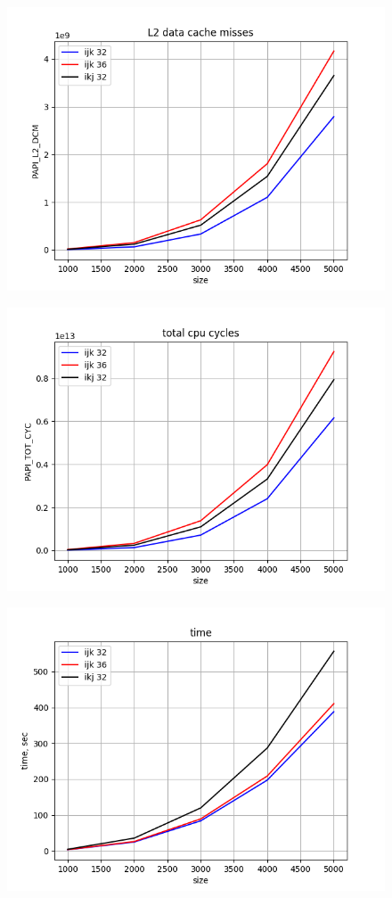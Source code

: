 \documentclass[14pt]{extarticle}
\begin{document}
\begin{figure}[H]
	\centering
	\includegraphics[scale=1]{Figure_2}
\end{figure}

\begin{figure}[H]
	\centering
	\includegraphics[scale=1]{Figure_3}
\end{figure}

\begin{figure}[H]
	\centering
	\includegraphics[scale=1]{Figure_4}
\end{figure}
\end{document}
